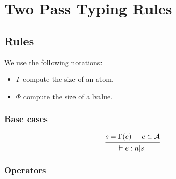 \documentclass{article}
\newcommand{\type}[3]{\vdash#2:#1[#3]}
\begin{document}
\section*{Two Pass Typing Rules}

\subsection*{Rules}


We use the following notations:
\begin{itemize}
    \item $\Gamma$ compute the size of an atom.
    \item $\Phi$ compute the size of a lvalue.
\end{itemize}


\subsubsection*{Base cases}

\begin{equation*}
    \begin{prooftree}
        \hypo{s = \Gamma(e)}
        \hypo{e \in \mathcal{A}}
        \infer2{\type{n}{e}{s}}
    \end{prooftree}
\end{equation*}

\subsubsection*{Operators}
\end{document}
